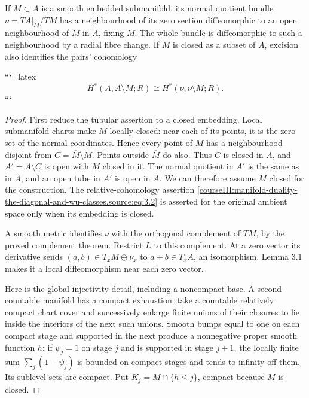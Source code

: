 \begin{theorem}
If \(M\subset A\) is a smooth embedded submanifold, its normal quotient bundle \(\nu=TA|_M/TM\) has a neighbourhood of its zero section diffeomorphic to an open neighbourhood of \(M\) in \(A\), fixing \(M\). The whole bundle is diffeomorphic to such a neighbourhood by a radial fibre change. If \(M\) is closed as a subset of \(A\), excision also identifies the pairs' cohomology


```{=latex}
\begin{equation}
H^*(A,A\setminus M;R)\cong H^*(\nu,\nu\setminus M;R).
\label{courseIII:manifold-duality-the-diagonal-and-wu-classes.source:eq:3.2}
\end{equation}
```


\end{theorem}
\begin{proof}
First reduce the tubular assertion to a closed embedding. Local submanifold charts make \(M\) locally closed: near each of its points, it is the zero set of the normal coordinates. Hence every point of \(M\) has a neighbourhood disjoint from \(C=\overline M\setminus M\). Points outside \(\overline M\) do also. Thus \(C\) is closed in \(A\), and \(A'=A\setminus C\) is open with \(M\) closed in it. The normal quotient in \(A'\) is the same as in \(A\), and an open tube in \(A'\) is open in \(A\). We can therefore assume \(M\) closed for the construction. The relative-cohomology assertion \eqref{courseIII:manifold-duality-the-diagonal-and-wu-classes.source:eq:3.2} is asserted for the original ambient space only when its embedding is closed.

A smooth metric identifies \(\nu\) with the orthogonal complement of \(TM\), by the proved complement theorem. Restrict \(L\) to this complement. At a zero vector its derivative sends \((a,b)\in T_xM\oplus\nu_x\) to \(a+b\in T_xA\), an isomorphism. Lemma 3.1 makes it a local diffeomorphism near each zero vector.

Here is the global injectivity detail, including a noncompact base. A second-countable manifold has a compact exhaustion: take a countable relatively compact chart cover and successively enlarge finite unions of their closures to lie inside the interiors of the next such unions. Smooth bumps equal to one on each compact stage and supported in the next produce a nonnegative proper smooth function \(h\): if \(\psi_j=1\) on stage \(j\) and is supported in stage \(j+1\), the locally finite sum \(\sum_j(1-\psi_j)\) is bounded on compact stages and tends to infinity off them. Its sublevel sets are compact. Put \(K_j=M\cap\{h\leq j\}\), compact because \(M\) is closed.


\end{proof}
